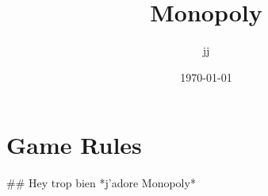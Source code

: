 \documentclass{article}%
\title{Monopoly}%
\author{jj}%
\date{\today}%
\begin{document}
%
\pagestyle{empty}%
\normalsize%
\maketitle%
\section{Game Rules}%
\label{sec:GameRules}%
\#\# Hey trop bien
\newline%
*j'adore Monopoly*

%
\end{document}
